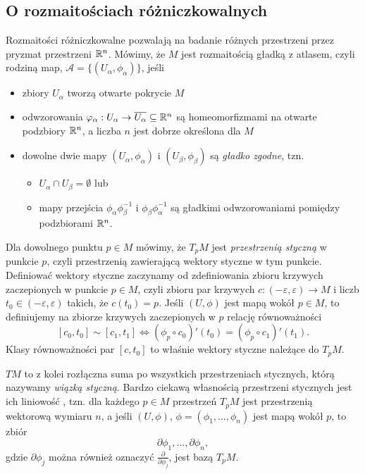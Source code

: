 \subsection{O rozmaitościach różniczkowalnych}

Rozmaitości różniczkowalne pozwalają na badanie różnych przestrzeni przez pryzmat przestrzeni $\mathbb{R}^n$. Mówimy, że $M$ jest rozmaitością gładką z atlasem, czyli rodziną map, $\mathcal{A}=\{ (U_\alpha, \phi_\alpha) \}$, jeśli
\begin{itemize}
  \item zbiory $U_\alpha$ tworzą otwarte pokrycie $M$
  \item odwzorowania $\varphi_\alpha:U_\alpha \to \overline{U_\alpha} \subseteq \mathbb{R}^n$ są homeomorfizmami na otwarte podzbiory $\mathbb{R}^n$, a liczba $n$ jest dobrze określona dla $M$
  \item dowolne dwie mapy $(U_\alpha, \phi_\alpha)$ i $(U_\beta, \phi_\beta)$ są \emph{gładko zgodne}, tzn.
    \begin{itemize}
      \item $U_\alpha \cap U_\beta=\emptyset$ lub
      \item mapy przejścia $\phi_\alpha \phi_\beta^{-1}$ i $\phi_\beta \phi_\alpha^{-1}$ są gładkimi odwzorowaniami pomiędzy podzbiorami $\mathbb{R}^n$.
    \end{itemize}
\end{itemize}

Dla dowolnego punktu $p \in M$ mówimy, że $T_p M$ jest \emph{przestrzenią styczną} w punkcie $p$, czyli przestrzenią zawierającą wektory styczne w tym punkcie. Definiować wektory styczne zaczynamy od zdefiniowania zbioru krzywych zaczepionych w punkcie $p \in M$, czyli zbioru par krzywych $c: (-\varepsilon, \varepsilon) \to M$ i liczb $t_0 \in (-\varepsilon, \varepsilon)$ takich, że $c(t_0)=p$. Jeśli $(U, \phi)$ jest mapą wokół $p \in M$, to definiujemy na zbiorze krzywych zaczepionych w $p$ relację równoważności 
$$ [c_0, t_0] \sim [c_1, t_1] \iff (\phi_p \circ  c_0)'(t_0)=(\phi_p \circ  c_1)'(t_1). $$
Klasy równoważności par $[c, t_0]$ to właśnie wektory styczne należące do $T_p M$.


$T M$ to z kolei rozłączna suma po wszystkich przestrzeniach stycznych, którą nazywamy \emph{wiązką styczną}. Bardzo ciekawą własnością przestrzeni stycznych jest ich liniowość \cite{leeSmoothManifolds}, tzn. dla każdego $p \in M$ przestrzeń $T_p M$ jest przestrzenią wektorową wymiaru $n$, a jeśli $(U, \phi)$, $\phi=(\phi_1,...,\phi_n)$ jest mapą wokół $p$, to zbiór
$$ { \partial \phi_1,..., \partial \phi_n }, $$
gdzie $\partial \phi_j$ można również oznaczyć $\frac{\partial}{\partial \phi_j}$, jest bazą $T_p M$.
